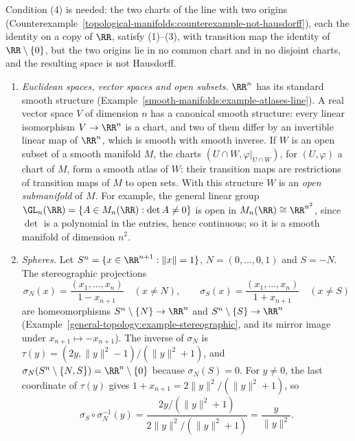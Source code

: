 \begin{counterexample}\label{smooth-manifolds:counterexample-chart-lemma}
Condition (4) is needed: the two charts of the line with two origins (Counterexample~\ref{topological-manifolds:counterexample-not-hausdorff}), each the identity on a copy of $\RR$, satisfy (1)--(3), with transition map the
identity of $\RR \setminus \{0\}$, but the two origins lie in no common chart and in no disjoint charts, and the resulting space is not Hausdorff.
\end{counterexample}

\begin{example}\label{smooth-manifolds:example-manifolds}
\begin{enumerate}
\item \emph{Euclidean spaces, vector spaces and open subsets.} $\RR^n$ has its standard smooth structure (Example~\ref{smooth-manifolds:example-atlases-line}).
A real vector space $V$ of dimension $n$ has a canonical smooth structure: every linear isomorphism $V \to \RR^n$ is a chart, and two of them differ by an
invertible linear map of $\RR^n$, which is smooth with smooth inverse. If $W$ is an open subset of a smooth manifold $M$, the charts $(U \cap W,
\varphi|_{U \cap W})$, for $(U, \varphi)$ a chart of $M$, form a smooth atlas of $W$: their transition maps are restrictions of transition maps of $M$ to open
sets. With this structure $W$ is an \emph{open submanifold} of $M$. For example, the general linear group
$\GL_n(\RR) = \{A \in M_n(\RR) : \det A \neq 0\}$ is open in $M_n(\RR) \cong \RR^{n^2}$, since $\det$ is a polynomial in the entries, hence continuous; so it is a
smooth manifold of dimension $n^2$.
\item \emph{Spheres.} Let $S^n = \{x \in \RR^{n+1} : \|x\| = 1\}$, $N = (0, \ldots, 0, 1)$ and $S = -N$. The stereographic projections
\[
\sigma_N(x) = \frac{(x_1, \ldots, x_n)}{1 - x_{n+1}} \quad (x \neq N), \qquad \sigma_S(x) = \frac{(x_1, \ldots, x_n)}{1 + x_{n+1}} \quad (x \neq S)
\]
are homeomorphisms $S^n \setminus \{N\} \to \RR^n$ and $S^n \setminus \{S\} \to \RR^n$ (Example~\ref{general-topology:example-stereographic}, and its mirror
image under $x_{n+1} \mapsto -x_{n+1}$). The inverse of $\sigma_N$ is $\tau(y) = (2y, \|y\|^2 - 1)/(\|y\|^2 + 1)$, and $\sigma_N(S^n \setminus \{N, S\}) =
\RR^n \setminus \{0\}$ because $\sigma_N(S) = 0$. For $y \neq 0$, the last coordinate of $\tau(y)$ gives $1 + x_{n+1} = 2\|y\|^2/(\|y\|^2 + 1)$, so
\[
\sigma_S \circ \sigma_N^{-1}(y) = \frac{2y/(\|y\|^2 + 1)}{2\|y\|^2/(\|y\|^2 + 1)} = \frac{y}{\|y\|^2}.
\]
\end{enumerate}
\end{example}
